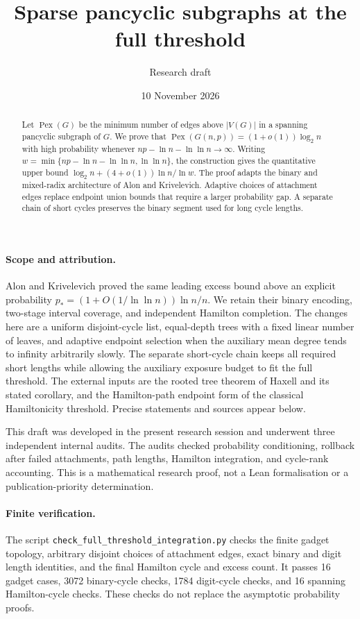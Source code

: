 \documentclass[11pt]{article}
\title{Sparse pancyclic subgraphs at the full threshold}
\author{Research draft}
\date{10 November 2026}
\begin{document}
\maketitle
\begin{abstract}
Let $\operatorname{Pex}(G)$ be the minimum number of edges above $|V(G)|$ in a spanning pancyclic subgraph of $G$.
We prove that $\operatorname{Pex}(G(n,p))=(1+o(1))\log_2n$ with high probability whenever
$np-\ln n-\ln\ln n\to\infty$.
Writing $w=\min\{np-\ln n-\ln\ln n,\ln\ln n\}$, the construction gives the quantitative upper bound
$\log_2n+(4+o(1))\ln n/\ln w$.
The proof adapts the binary and mixed-radix architecture of Alon and Krivelevich.
Adaptive choices of attachment edges replace endpoint union bounds that require a larger probability gap.
A separate chain of short cycles preserves the binary segment used for long cycle lengths.
\end{abstract}

\paragraph{Scope and attribution.}
Alon and Krivelevich proved the same leading excess bound above an explicit probability
$p_*=(1+O(1/\ln\ln n))\ln n/n$.
We retain their binary encoding, two-stage interval coverage, and independent Hamilton completion.
The changes here are a uniform disjoint-cycle list, equal-depth trees with a fixed linear number of leaves,
and adaptive endpoint selection when the auxiliary mean degree tends to infinity arbitrarily slowly.
The separate short-cycle chain keeps all required short lengths while allowing the auxiliary exposure budget to fit the full threshold.
The external inputs are the rooted tree theorem of Haxell and its stated corollary,
and the Hamilton-path endpoint form of the classical Hamiltonicity threshold.
Precise statements and sources appear below.

This draft was developed in the present research session and underwent three independent internal audits.
The audits checked probability conditioning, rollback after failed attachments, path lengths, Hamilton integration, and cycle-rank accounting.
This is a mathematical research proof, not a Lean formalisation or a publication-priority determination.




\paragraph{Finite verification.}
The script \texttt{check\_full\_threshold\_integration.py} checks the finite gadget topology,
arbitrary disjoint choices of attachment edges, exact binary and digit length identities,
and the final Hamilton cycle and excess count.
It passes 16 gadget cases, 3072 binary-cycle checks, 1784 digit-cycle checks, and 16 spanning Hamilton-cycle checks.
These checks do not replace the asymptotic probability proofs.
\end{document}
